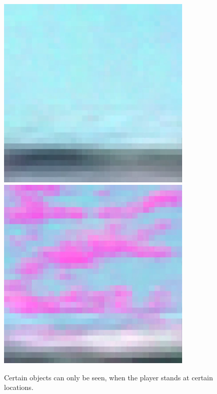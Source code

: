 \begin{figure}[p]
  \centering
  \includegraphics[width=0.83\textwidth]{images/workflow/WalkingSimNothing.png} \\[\picVdist]
  \includegraphics[width=0.83\textwidth]{images/workflow/WalkingSimCloud.png}
  \caption{Certain objects can only be seen, when the player stands at certain locations.}
  \label{WalkingSim}
\end{figure}


\newpage
